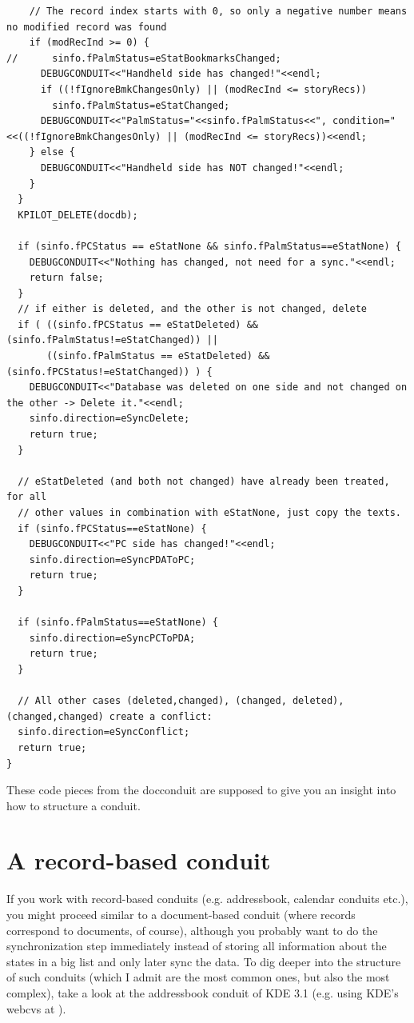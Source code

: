 \documentclass[10pt,a4paper]{article}
\begin{document}
{\begin{verbatim}
    // The record index starts with 0, so only a negative number means no modified record was found
    if (modRecInd >= 0) {
//      sinfo.fPalmStatus=eStatBookmarksChanged;
      DEBUGCONDUIT<<"Handheld side has changed!"<<endl;
      if ((!fIgnoreBmkChangesOnly) || (modRecInd <= storyRecs)) 
        sinfo.fPalmStatus=eStatChanged;
      DEBUGCONDUIT<<"PalmStatus="<<sinfo.fPalmStatus<<", condition="<<((!fIgnoreBmkChangesOnly) || (modRecInd <= storyRecs))<<endl;
    } else {
      DEBUGCONDUIT<<"Handheld side has NOT changed!"<<endl;
    }
  }
  KPILOT_DELETE(docdb);

  if (sinfo.fPCStatus == eStatNone && sinfo.fPalmStatus==eStatNone) {
    DEBUGCONDUIT<<"Nothing has changed, not need for a sync."<<endl;
    return false;
  }
  // if either is deleted, and the other is not changed, delete
  if ( ((sinfo.fPCStatus == eStatDeleted) && (sinfo.fPalmStatus!=eStatChanged)) ||
       ((sinfo.fPalmStatus == eStatDeleted) && (sinfo.fPCStatus!=eStatChanged)) ) {
    DEBUGCONDUIT<<"Database was deleted on one side and not changed on the other -> Delete it."<<endl;
    sinfo.direction=eSyncDelete;
    return true;
  }
  
  // eStatDeleted (and both not changed) have already been treated, for all 
  // other values in combination with eStatNone, just copy the texts.
  if (sinfo.fPCStatus==eStatNone) {
    DEBUGCONDUIT<<"PC side has changed!"<<endl;
    sinfo.direction=eSyncPDAToPC;
    return true;
  }

  if (sinfo.fPalmStatus==eStatNone) {
    sinfo.direction=eSyncPCToPDA;
    return true;
  }
  
  // All other cases (deleted,changed), (changed, deleted), (changed,changed) create a conflict:
  sinfo.direction=eSyncConflict;
  return true;
}

\end{verbatim}
}


These code pieces from the docconduit are supposed to give you an insight into how to structure a conduit. 






\section{A record-based conduit}\label{SectionRecordBasedConduit}
If you work with record-based conduits (e.g. addressbook, calendar conduits etc.), you might proceed similar to a document-based conduit (where records correspond to documents, of course), although you probably want to do the synchronization step immediately instead of storing all information about the states in a big list and only later sync the data. To dig deeper into the structure of such conduits (which I admit are the most common ones, but also the most complex), take a look at the addressbook conduit of KDE 3.1 (e.g. using KDE's webcvs at ).
\end{document}
